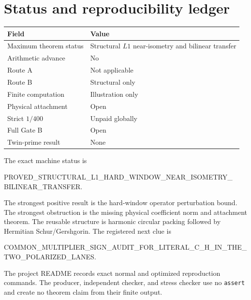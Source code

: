 \section{Status and reproducibility ledger}

\begin{center}
\begin{tabular}{@{}ll@{}}
\toprule
Field & Value \\
\midrule
Maximum theorem status & Structural $L1$ near-isometry and bilinear transfer \\
Arithmetic advance & No \\
Route A & Not applicable \\
Route B & Structural only \\
Finite computation & Illustration only \\
Physical attachment & Open \\
Strict $1/400$ & Unpaid globally \\
Full Gate B & Open \\
Twin-prime result & None \\
\bottomrule
\end{tabular}
\end{center}

The exact machine status is
\begin{center}
\small\ttfamily
PROVED\_STRUCTURAL\_L1\_HARD\_WINDOW\_NEAR\_ISOMETRY\_\allowbreak
BILINEAR\_TRANSFER.
\end{center}

The strongest positive result is the hard-window operator perturbation bound.
The strongest obstruction is the missing physical coefficient norm and
attachment theorem.  The reusable structure is harmonic circular packing
followed by Hermitian Schur/Gershgorin.  The registered next clue is
\begin{center}
\small\ttfamily
COMMON\_MULTIPLIER\_SIGN\_AUDIT\_FOR\_LITERAL\_C\_H\_IN\_THE\_\allowbreak
TWO\_POLARIZED\_LANES.
\end{center}

The project README records exact normal and optimized reproduction commands.
The producer, independent checker, and stress checker use no \texttt{assert}
and create no theorem claim from their finite output.
